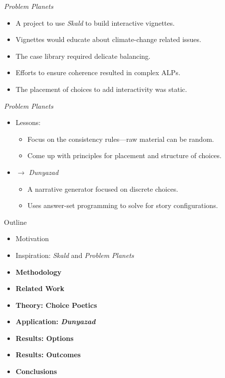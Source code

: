\documentclass[xcolor=x11names]{beamer}
\def\dunyazad/{\textit{Dunyazad}}
\def\skald/{\textit{Skald}}
\def\problemplanets/{\textit{Problem Planets}}
\begin{document}
\begin{frame}{\problemplanets/}
  \begin{itemize}\addtolength{\itemsep}{0.5\baselineskip}
    \item A project to use \skald/ to build interactive vignettes.
    \item Vignettes would educate about climate-change related issues.
    \item The case library required delicate balancing.
    \item Efforts to ensure coherence resulted in complex ALPs.
    \item The placement of choices to add interactivity was static.
  \end{itemize}
\end{frame}

\begin{frame}{\problemplanets/}
  \begin{itemize}\addtolength{\itemsep}{0.5\baselineskip}
    \item Lessons:
    \begin{itemize}\addtolength{\itemsep}{0.5\baselineskip}
      \vspace{0.5\baselineskip}
      \item Focus on the consistency rules---raw material can be random.
      \item Come up with principles for placement and structure of choices.
    \end{itemize}
    \item $\rightarrow$ \dunyazad/
    \begin{itemize}\addtolength{\itemsep}{0.5\baselineskip}
      \vspace{0.5\baselineskip}
      \item A narrative generator focused on discrete choices.
      \item Uses answer-set programming to solve for story configurations.
    \end{itemize}
  \end{itemize}
\end{frame}

\begin{frame}{Outline}
  \begin{itemize}
    \item Motivation
    \item Inspiration: \skald/ and \problemplanets/
    \item \textbf{Methodology}
    \item \textbf{Related Work}
    \item \textbf{Theory: Choice Poetics}
    \item \textbf{Application: \dunyazad/}
    \item \textbf{Results: Options}
    \item \textbf{Results: Outcomes}
    \item \textbf{Conclusions}
  \end{itemize}
\end{frame}
\end{document}
